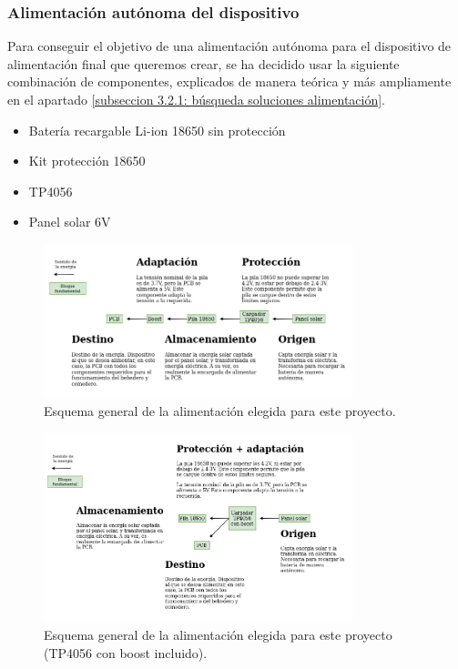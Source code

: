 \documentclass[12pt]{article}
\begin{document}
	\subsubsection{Alimentación autónoma del dispositivo}
	
	\noindent Para conseguir el objetivo de una alimentación autónoma para el dispositivo de alimentación final que queremos crear, se ha decidido usar la siguiente combinación de componentes, explicados de manera teórica y más ampliamente en el apartado \ref{subseccion 3.2.1: búsqueda soluciones alimentación}. \\
	
	\begin{itemize}
		\item Batería recargable Li-ion 18650 sin protección
		\item Kit protección 18650
		\item TP4056
		\item Panel solar 6V
	\end{itemize}
	
	\begin{figure}[h]
		\begin{center}
			\includegraphics[width=0.8\textwidth]{img/conexiones tfg-alimentacion.png}
			\caption{Esquema general de la alimentación elegida para este proyecto.}
			\label{Alimentación: esquema general}
		\end{center}
	\end{figure}

	\begin{figure}[h]
		\begin{center}
			\includegraphics[width=0.8\textwidth]{img/conexiones tfg-alimentacion (boost en tp).png}
			\caption{Esquema general de la alimentación elegida para este proyecto (TP4056 con boost incluido).}
			\label{Alimentación: esquema general (tp con boost)}
		\end{center}
	\end{figure}
\end{document}
